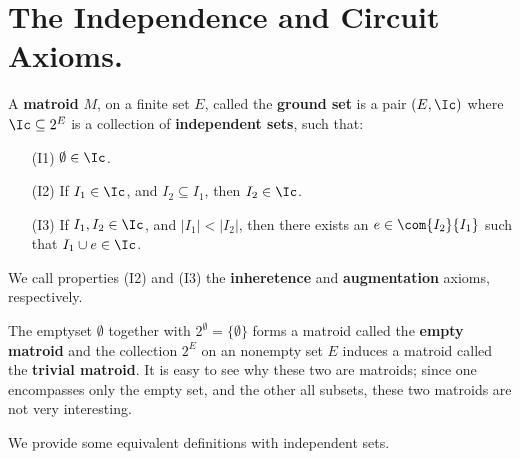 
\section{The Independence and Circuit Axioms.}

\begin{definition}
    A \textbf{matroid} $M$, on a finite set $E$, called the \textbf{ground set}
    is  a pair $(E,\Ic)$ where $\Ic \subseteq 2^E$ is a collection of
    \textbf{independent sets}, such that:
    \begin{enumerate}
        \item[(I1)] $\emptyset \in \Ic$.

        \item [(I2)] If $I_1 \in \Ic$, and  $I_2 \subseteq I_1$, then  $I_2 \in
            \Ic$.

        \item[(I3)] If $I_1,I_2 \in \Ic$, and  $|I_1|<|I_2|$, then there exists
            an  $e \in \com{{I_2}}{I_1}$ such that $I_1 \cup e \in \Ic$.
    \end{enumerate}
    We call properties (I2) and (I3) the \textbf{inheretence} and
    \textbf{augmentation} axioms, respectively.
\end{definition}

\begin{example}\label{1.1}
    \begin{enumerate}
        The emptyset $\emptyset$ together with $2^\emptyset=\{\emptyset\}$ forms
        a matroid called the \textbf{empty matroid} and the collection $2^E$ on an
        nonempty set $E$ induces a matroid called the \textbf{trivial matroid}.
        It is easy to see why these two are matroids; since one encompasses only
        the empty set, and the other all subsets, these two matroids are not
        very interesting.
    \end{enumerate}
\end{example}

We provide some equivalent definitions with independent sets.

